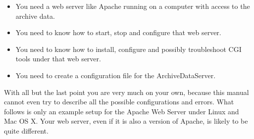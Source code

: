 \begin{itemize}
\item You need a web server like Apache running on a computer
      with access to the archive data.
\item You need to know how to start, stop and configure that
      web server.
\item You need to know how to install, configure and possibly
      troubleshoot CGI tools under that web server.
\item You need to create a configuration file for the ArchiveDataServer.
\end{itemize}

\noindent With all but the last point you are very much on your own, because
this manual cannot even try to describe all the possible configurations
and errors.
What follows is only an example setup for the Apache Web Server under Linux
and Mac OS X. Your web server, even if it is also a version of Apache,
is likely to be quite different.

